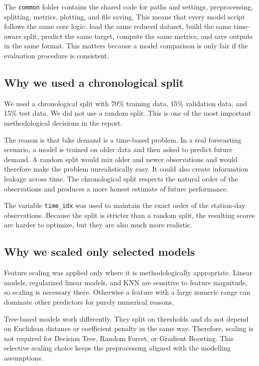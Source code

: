 \documentclass[conference]{IEEEtran}
\begin{document}
The \texttt{common} folder contains the shared code for paths and settings, preprocessing, splitting, 
metrics, plotting, and file saving. This means that every model script follows the same core logic: 
load the same reduced dataset, build the same time-aware split, predict the same target, compute the 
same metrics, and save outputs in the same format. This matters because a model comparison is only 
fair if the evaluation procedure is consistent.

\subsection{Why we used a chronological split}
We used a chronological split with 70\% training data, 15\% validation data, and 15\% test data. 
We did not use a random split. This is one of the most important methodological decisions in the report.

The reason is that bike demand is a time-based problem. In a real forecasting scenario, a model is 
trained on older data and then asked to predict future demand. A random split would mix older and 
newer observations and would therefore make the problem unrealistically easy. It could also create 
information leakage across time. The chronological split respects the natural order of the 
observations and produces a more honest estimate of future performance.

The variable \texttt{time\_idx} was used to maintain the exact order of the station-day observations. 
Because the split is stricter than a random split, the resulting scores are harder to optimize, 
but they are also much more realistic.

\subsection{Why we scaled only selected models}
Feature scaling was applied only where it is methodologically appropriate. Linear models, regularized 
linear models, and KNN are sensitive to feature magnitude, so scaling is necessary there. Otherwise a 
feature with a large numeric range can dominate other predictors for purely numerical reasons.

Tree-based models work differently. They split on thresholds and do not depend on Euclidean distance 
or coefficient penalty in the same way. Therefore, scaling is not required for Decision Tree, Random 
Forest, or Gradient Boosting. This selective scaling choice keeps the preprocessing aligned with the 
modelling assumptions.
\end{document}
